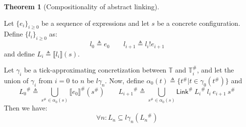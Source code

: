 \documentclass[acmsmall,screen,review]{acmart}
\theoremstyle{definition}
\newtheorem{thm}{Theorem}[section]
\newcommand*{\A}[1]{{#1}^{\#}}
\newcommand*{\Time}{\mathbb{T}}
\newcommand*{\ATime}{\A{\Time}}
\newcommand*{\link}[2]{{#1}\mathtt{!}{#2}}
\newcommand*{\Link}{\mathsf{Link}}
\newcommand*{\sembracket}[1]{\lBrack{#1}\rBrack}
\begin{document}
\begin{thm}[Compositionality of abstract linking]
  $\:$

  Let $\{e_i\}_{i\ge 0}$ be a sequence of expressions and let $s$ be a concrete configuration. Define $\{l_i\}_{i\ge 0}$ as:
  \[
    l_0\triangleq e_0\qquad l_{i+1}\triangleq\link{l_i}{e_{i+1}}
  \]
  and define $L_i\triangleq\sembracket{l_i}(s)$.

  Let $\gamma_i$ be a tick-approximating concretization between $\Time$ and $\ATime_i$, and let the union of $\gamma_i$ from $i=0$ to $n$ be $l\gamma_n$.
  Now, define $\alpha_0(t)\triangleq\{\A{t}|t\in\gamma_0(\A{t})\}$ and
  \[
    \A{L_0}\triangleq\bigcup_{\A{s}\in\alpha_0(s)}\A{\sembracket{e_0}}(\A{s})\qquad\A{L_{i+1}}\triangleq\bigcup_{\A{s}\in \alpha_0(s)}\A\Link\:\A{L_i}\:l_i\:e_{i+1}\:\A{s}
  \]
  Then we have:
  \[
    \forall n:L_n\subseteq l\gamma_n(\A{L_n})
  \]
\end{thm}

\end{document}
